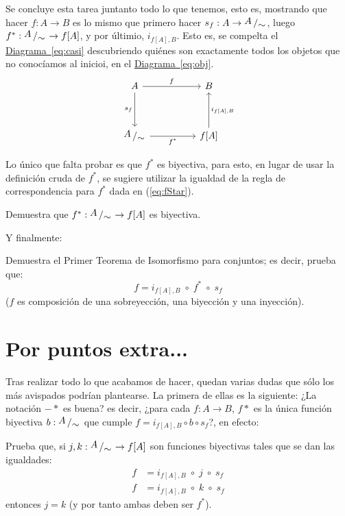 \documentclass[letterpaper,DIV=14,headsepline,12pt]{scrartcl}
\newcommand{\pts}{}
\newenvironment{ejercicio}[1]{\ifthenelse{\equal{#1}{1} \OR \equal{#1}{+1}}{\renewcommand{\pts}{\textbf{(#1 pt)}}}{\renewcommand{\pts}{\textbf{(#1 pts)}}}\begin{ejj}\upshape \pts}{\end{ejj}}
\newcommand{\quot}[2]{{\raisebox{.2em}{$#1$}\left/\raisebox{-.2em}{$#2$}\right.}}
\begin{document}
    Se concluye esta tarea juntanto todo lo que tenemos, esto es, mostrando que hacer $f:A\to B$ es lo mismo que primero hacer $s_f:A\to \quot{A}{\sim}$, luego $f^*:\quot{A}{\sim} \to f[A]$, y por últimio, $i_{f[A],B}$. Esto es, se compelta el \hyperref[eq:obj]{Diagrama~\ref*{eq:casi}} descubriendo quiénes son exactamente todos los objetos que no conocíamos al inicioi, en el \hyperref[eq:obj]{Diagrama~\ref*{eq:obj}}.
    \begin{equation}\label{eq:ya}
        \begin{tikzcd}
            A && B \\
            \\
            \quot{A}{\sim} && {f[A]}
            \arrow["f", from=1-1, to=1-3]
            \arrow["s_f"', from=1-1, to=3-1]
            \arrow["f^*"', from=3-1, to=3-3]
            \arrow["{i_{f[A],B}}"', from=3-3, to=1-3]
        \end{tikzcd}
    \end{equation}

    Lo único que falta probar es que $f^*$ es biyectiva, para esto, en lugar de usar la definición cruda de $f^*$, se sugiere utilizar la igualdad de la regla de correspondencia para $f^*$ dada en (\ref{eq:fStar}).

    \begin{ejercicio}{1}
        Demuestra que $f^*:\quot{A}{\sim} \to f[A]$ es biyectiva.
    \end{ejercicio}

    Y finalmente:
    \begin{ejercicio}{.5}
        Demuestra el Primer Teorema de Isomorfismo para conjuntos; es decir, prueba que:
        \[ f=i_{f[A],B} \; \circ \; f^* \; \circ \; s_f \]
        ($f$ es composición de una sobreyección, una biyección y una inyección).
    \end{ejercicio}

    \section*{Por puntos extra...}

    Tras realizar todo lo que acabamos de hacer, quedan varias dudas que sólo los más avispados podrían plantearse. La primera de ellas es la siguiente: ¿La notación $-*$ es buena? es decir, ¿para cada $f:A \to B$, $f*$ es la única función biyectiva $b:\quot{A}{\sim}$ que cumple $f=i_{f[A],B} \circ b \circ s_f$?, en efecto:
    
    \begin{ejercicio}{+2}
        Prueba que, si $j,k:\quot{A}{\sim} \to f[A]$ son funciones biyectivas tales que se dan las igualdades:
        \begin{align*}
            f & = i_{f[A],B} \; \circ \; j \; \circ \; s_f \\
            f & = i_{f[A],B} \; \circ \; k \; \circ \; s_f
        \end{align*}
        entonces $j=k$ (y por tanto ambas deben ser $f^*$).
    \end{ejercicio}
\end{document}

